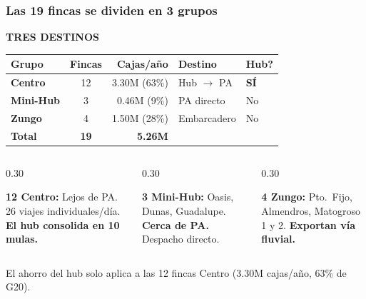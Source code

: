 \documentclass[aspectratio=169, 10pt]{beamer}
\newcommand{\tagline}[2]{{\scriptsize\color{#1}\textbf{\MakeUppercase{#2}}}}
\begin{document}
\begin{frame}
\frametitle{Las 19 fincas se dividen en 3 grupos}
\tagline{azul}{Tres Destinos}
\vspace{-2pt}

\begin{center}
\scriptsize
\renewcommand{\arraystretch}{1.1}
\begin{tabular}{l c r l l}
    \toprule
    \textbf{Grupo} & \textbf{Fincas} & \textbf{Cajas/a\~no} & \textbf{Destino} & \textbf{Hub?} \\
    \midrule
    \textcolor{verde}{\textbf{Centro}} & 12 & 3.30M (63\%) & Hub $\rightarrow$ PA & \textcolor{verde}{\textbf{S\'I}} \\
    \textcolor{cian}{\textbf{Mini-Hub}} & 3 & 0.46M (9\%) & PA directo & No \\
    \textcolor{naranja}{\textbf{Zungo}} & 4 & 1.50M (28\%) & Embarcadero & No \\
    \midrule
    \textbf{Total} & \textbf{19} & \textbf{5.26M} & & \\
    \bottomrule
\end{tabular}
\end{center}

\vspace{4pt}
\begin{columns}[T]
\begin{column}{0.30\textwidth}
\colorbox{verdeclaro}{\parbox{\dimexpr\linewidth-8pt}{\scriptsize\strut
\textcolor{verde}{\textbf{12 Centro:}} Lejos de PA.
26 viajes individuales/d\'ia.
\textbf{El hub consolida en 10 mulas.}\strut}}
\end{column}
\begin{column}{0.30\textwidth}
\colorbox{azulclaro}{\parbox{\dimexpr\linewidth-8pt}{\scriptsize\strut
\textcolor{azul}{\textbf{3 Mini-Hub:}} Oasis, Dunas,
Guadalupe. \textbf{Cerca de PA.}
Despacho directo.\strut}}
\end{column}
\begin{column}{0.30\textwidth}
\colorbox{amarilloclaro}{\parbox{\dimexpr\linewidth-8pt}{\scriptsize\strut
\textcolor{amarillo}{\textbf{4 Zungo:}} Pto.\ Fijo,
Almendros, Matogroso 1 y 2.
\textbf{Exportan v\'ia fluvial.}\strut}}
\end{column}
\end{columns}

\vspace{3pt}
{\tiny\color{gris} El ahorro del hub solo aplica a las 12 fincas Centro (3.30M cajas/a\~no, 63\% de G20).}
\end{frame}
\end{document}
